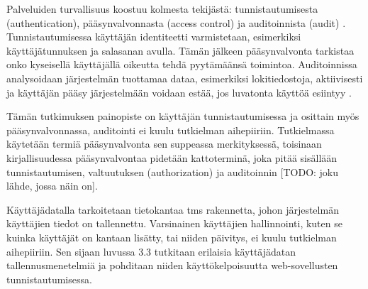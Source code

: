 Palveluiden turvallisuus koostuu kolmesta tekijästä: tunnistautumisesta (authentication), pääsynvalvonnasta (access control) ja auditoinnista (audit) \cite{sandhu}. Tunnistautumisessa käyttäjän identiteetti varmistetaan, esimerkiksi käyttäjätunnuksen ja salasanan avulla. Tämän jälkeen pääsynvalvonta tarkistaa onko kyseisellä käyttäjällä oikeutta tehdä pyytämäänsä toimintoa. Auditoinnissa analysoidaan järjestelmän tuottamaa dataa, esimerkiksi lokitiedostoja, aktiivisesti ja käyttäjän pääsy järjestelmään voidaan estää, jos luvatonta käyttöä esiintyy \cite{sandhu}.

Tämän tutkimuksen painopiste on käyttäjän tunnistautumisessa ja osittain myös pääsynvalvonnassa, auditointi ei kuulu tutkielman aihepiiriin. Tutkielmassa käytetään termiä pääsynvalvonta sen suppeassa merkityksessä, toisinaan kirjallisuudessa pääsynvalvontaa pidetään kattoterminä, joka pitää sisällään tunnistautumisen, valtuutuksen (authorization) ja auditoinnin [TODO: joku lähde, jossa näin on].

Käyttäjädatalla tarkoitetaan tietokantaa tms rakennetta, johon järjestelmän käyttäjien tiedot on tallennettu. Varsinainen käyttäjien hallinnointi, kuten se kuinka käyttäjät on kantaan lisätty, tai niiden päivitys, ei kuulu tutkielman aihepiiriin. Sen sijaan luvussa 3.3 tutkitaan erilaisia käyttäjädatan tallennusmenetelmiä ja pohditaan niiden käyttökelpoisuutta web-sovellusten tunnistautumisessa.
